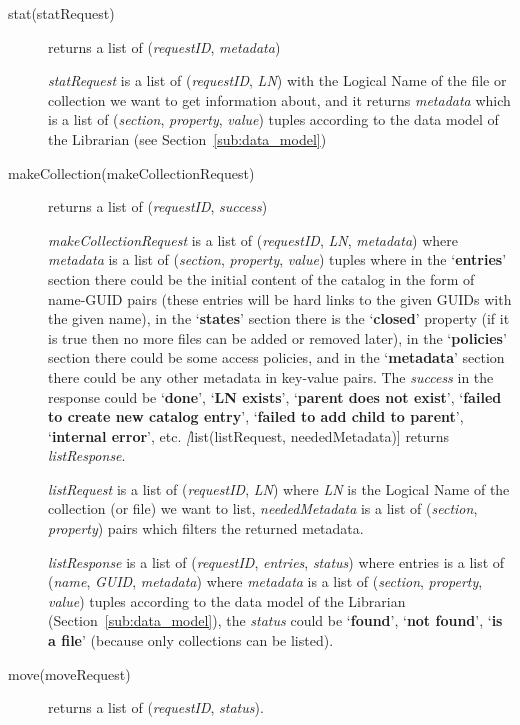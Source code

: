 \documentclass{book}
\begin{document}
\begin{description}
    \item[stat(statRequest)] returns a list of (\emph{requestID}, \emph{metadata})
    
    \emph{statRequest} is a list of (\emph{requestID}, \emph{LN}) with the Logical Name of the file or collection we want to get information about, and it returns \emph{metadata} which is a list of (\emph{section}, \emph{property}, \emph{value}) tuples according to the data model of the Librarian (see Section~\ref{sub:data_model})
    
    \item[makeCollection(makeCollectionRequest)] returns a list of (\emph{requestID}, \emph{success})
    
    \emph{makeCollectionRequest} is a list of (\emph{requestID}, \emph{LN}, \emph{metadata}) where \emph{metadata} is a list of (\emph{section}, \emph{property}, \emph{value}) tuples where in the `\textbf{entries}' section there could be the initial content of the catalog in the form of name-GUID pairs (these entries will be hard links to the given GUIDs with the given name), in the `\textbf{states}' section there is the `\textbf{closed}' property (if it is true then no more files can be added or removed later), in the `\textbf{policies}' section there could be some access policies, and in the `\textbf{metadata}' section there could be any other metadata in key-value pairs. The \emph{success} in the response could be `\textbf{done}', `\textbf{LN exists}', `\textbf{parent does not exist}', `\textbf{failed to create new catalog entry}', `\textbf{failed to add child to parent}', `\textbf{internal error}', etc.
    \emph[list(listRequest, neededMetadata)] returns \emph{listResponse}.
    
    \emph{listRequest} is a list of (\emph{requestID}, \emph{LN}) where \emph{LN} is the Logical Name of the collection (or file) we want to list, \emph{neededMetadata} is a list of (\emph{section}, \emph{property}) pairs which filters the returned metadata.
    
    \emph{listResponse} is a list of (\emph{requestID}, \emph{entries}, \emph{status}) where entries is a list of (\emph{name}, \emph{GUID}, \emph{metadata}) where \emph{metadata} is a list of (\emph{section}, \emph{property}, \emph{value}) tuples according to the data model of the Librarian (Section~\ref{sub:data_model}), the \emph{status} could be `\textbf{found}', `\textbf{not found}', `\textbf{is a file}' (because only collections can be listed).
    
    \item[move(moveRequest)] returns a list of (\emph{requestID}, \emph{status}).
    

\end{description}
\end{document}
